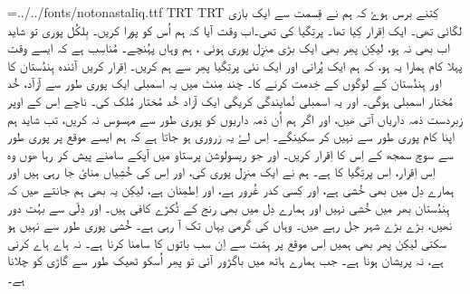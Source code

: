 
\pagewidth=210mm
\pageheight=297mm
\hsize=210mm
\hsize=190mm
\hoffset=10mm
\voffset=10mm
\nopagenumbers
\parindent=0mm
\font\noto={../../fonts/notonastaliq.ttf}
\textdir TRT
\pardir TRT
\noto
کِتنے برس ہوۓ کہ ہم نے قِسمت سے ایک بازی لگائی تھی۔ ایک اِقرار کِیا تھا۔ پرتِگیا کی
تھی۔اب وقت آیا کہ ہم اُس کو پورا کریں۔ بِلکُل پوری تو شاید اب بھی نہ ہو، لیکِن پھِر
بھی ایک بڑی منزِل پوری ہوئی ، ہم وہاں پہُنچے۔ مُناسِب ہے کہ ایسے وقت پہلا کام ہمارا
یہ ہو، کہ ہم ایک پُرانی اور ایک نئی پرتِگیا پھِر سے ہم کریں۔ اِقرار کریں آئندہ
ہِندُستان کا اور ہِندُستان کے لوگوں کے خِدمت کرنے کا۔ چند مِنٹ میں یہ اسمبلی ایک پوری
طور سے آزآد، خُد مُختار اسمبلی ہوگی۔ اور یہ اسمبلی نُمایندگی کریگی ایک آزاد خُد
مُختار مُلک کی۔ ناچے اِس کے اوپر زبردست ذمہ داریاں آتی ھیں، اور اگر ہم اُن ذمہ
داریوں کو پوری طور سے مہسوس نہ کریں، تب شاید ہم اپنا کام پوری طور سے نہیں کر
سکینگے۔ اِس لۓ یہ زروری ہو جاتا ہے کہ ہم ایسے موقع پر پوری طور سے سوچ سمجھ کے اِس
کا اِقرار کریں۔ اور جو ریسولوشن پرستاو میں آپکے سامنے پیش کر رہا ھوں وہ اِس
اِقرار، اِس پرتِگیا کا ہے۔ ہم نے ایک منزِل پوری کی، اور اِس کی خُشِیاں منایٔ جا رہی ہیں
اور ہمارے دِل میں بھی خُشی ہے، اور کِسی کدر غُرور ہے، اور اِطمِنان ہے، لیکِن یہ بھی ہم
جانتے ھیں کہ ہِندُستان بھر میں خُشی نہیں اور ہمارے دِل میں بھی رنج کے ٹُکڑے کافی
ہیں۔ اور دِلّی سے بہُت دور نھیں، بڑے بڑے شہر جل رہے ھیں۔ وہاں کی گرمی یہاں تک آ
رہی ہے۔ خُشی پوری طور سے نہیں ہو سکتی لیکِن پھر بھی ہمیں اِس موقع پر ہِمّت سے اِن سب
باتوں کا سامنا کرنا ہے۔ نہ ہاے ہاے کرنی ہے، نہ پریشان ہونا ہے۔ جب ہمارے ہاتھ
میں باگڑور آئی تو پھِر اُسکو ٹھیک طور سے گاڑی کو چلانا ہے۔
\bye
